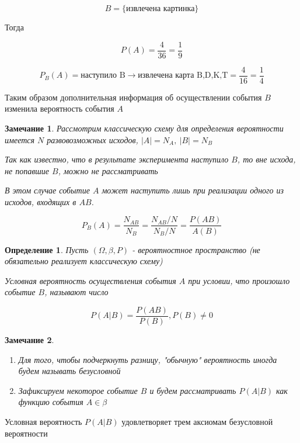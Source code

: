 \documentclass[a4paper, 14pt]{report}
\newtheorem{defenition}{Определение}[section]
\newtheorem{note}{Замечание}[section]
\begin{document}
$$
B = \{ \text{извлечена картинка} \}
$$

Тогда

$$
P(A) = \frac{4}{36} = \frac{1}{9}
$$

$$
P_B(A) = \text{наступило B} \to \text{извлечена карта B,D,K,T} = \frac{4}{16} = \frac{1}{4}
$$

Таким образом дополнительная информация об осуществлении события $B$ изменила вероятность события $A$

\begin{note}
    Рассмотрим классическую схему для определения вероятности имеется $N$ развовозможных исходов, $|A| = N_A,\ |B| = N_B$

    Так как известно, что в результате эксперимента наступило $B$, то вне исхода, не попавшие $B$, можно не рассматривать

    В этом случае событие $A$ может наступить лишь при реализации одного из исходов, входящих в $AB$.

    $$
    P_B(A) = \frac{N_{AB}}{N_B} = \frac{N_{AB} / N}{N_B / N} = \frac{P(AB)}{A(B)}
    $$
\end{note}

\begin{defenition}
    Пусть $(\Omega, \beta, P)$ - вероятностное пространство (не обязательно реализует классическую схему)

    Условная вероятность осуществления события $A$ при условии, что произошло событие $B$, называют число

    $$
    P(A|B) = \frac{P(AB)}{P(B)}, P(B) \ne 0
    $$
\end{defenition}

\begin{note}
    \begin{enumerate}
        \item Для того, чтобы подчеркнуть разницу, "обычную" вероятность иногда будем называть безусловной
        \item Зафиксируем некоторое событие $B$ и будем рассматривать $P(A|B)$ как функцию события $A \in \beta$
    \end{enumerate}
\end{note}

\begin{theorem}
    Условная вероятность $P(A|B)$ удовлетворяет трем аксиомам безусловной вероятности 
\end{theorem}
\end{document}
